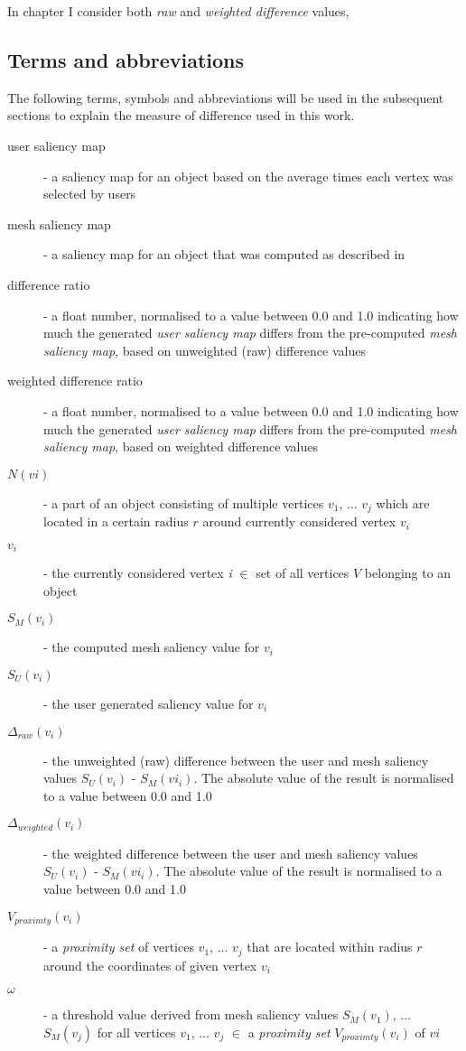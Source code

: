 In chapter %
I consider both \textit{raw} and \textit{weighted difference} values, 

		\subsection{Terms and abbreviations}
		\label{sec:concept_terms_and_abbreviations}
The following terms, symbols and abbreviations will be used in the subsequent sections to explain the measure of difference used in this work.

\begin{description}
	\item [user saliency map] - a saliency map for an object based on the average times each vertex was selected by users
	\item [mesh saliency map] - a saliency map for an object that was computed as described in \cite{lee2005mesh}
	\item[difference ratio] - a float number, normalised to a value between 0.0 and 1.0 indicating how much the generated \textit{user saliency map} differs from the pre-computed \textit{mesh saliency map}, based on unweighted (raw) difference values
	\item[weighted difference ratio] - a float number, normalised to a value between 0.0 and 1.0 indicating how much the generated \textit{user saliency map} differs from the pre-computed \textit{mesh saliency map}, based on weighted difference values
	\item[$N(vi)$] - a part of an object consisting of multiple vertices $v_1$, ... $v_j$ which are located in a certain radius $r$ around currently considered vertex $v_i$
	\item[$v_i$] - the currently considered vertex \textit{i} $\in$ set of all vertices $V$ belonging to an object
	\item[$S_{M}(v_i)$] - the computed mesh saliency value for $v_i$
	\item[$S_{U}(v_i)$] - the user generated saliency value for $v_i$
	\item[$\Delta_{raw}(v_i)$] - the unweighted (raw) difference between the user and mesh saliency values $S_{U}(v_i)$ - $S_{M}(vi_i)$. The absolute value of the result is normalised to a value between 0.0 and 1.0
	\item[$\Delta_{weighted}(v_i)$] - the weighted difference between the user and mesh saliency values $S_{U}(v_i)$ - $S_{M}(vi_i)$. The absolute value of the result is normalised to a value between 0.0 and 1.0
	\item[$V_{proximty}(v_i)$] - a \textit{proximity set} of vertices $v_1$, ... $v_j$ that are located within radius $r$ around the coordinates of given vertex $v_i$
	\item[$\omega$] - a threshold value derived from mesh saliency values $S_{M}(v_1)$, ... $S_{M}(v_j)$ for all vertices $v_1$, ... $v_j$ $\in$ a \textit{proximity set} $V_{proximty}(v_i)$ of $vi$
\end{description}

